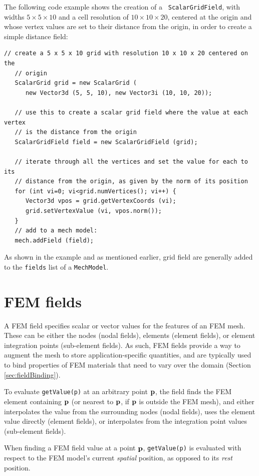 The following code example shows the creation of a {\tt
ScalarGridField}, with widths $5 \times 5 \times 10$ and a cell
resolution of $10 \times 10 \times 20$, centered at the origin and
whose vertex values are set to their distance from the origin,
in order to create a simple distance field:
%
\begin{lstlisting}[]
   // create a 5 x 5 x 10 grid with resolution 10 x 10 x 20 centered on the
   // origin
   ScalarGrid grid = new ScalarGrid (
      new Vector3d (5, 5, 10), new Vector3i (10, 10, 20));

   // use this to create a scalar grid field where the value at each vertex
   // is the distance from the origin
   ScalarGridField field = new ScalarGridField (grid);

   // iterate through all the vertices and set the value for each to its
   // distance from the origin, as given by the norm of its position
   for (int vi=0; vi<grid.numVertices(); vi++) {
      Vector3d vpos = grid.getVertexCoords (vi);
      grid.setVertexValue (vi, vpos.norm()); 
   }
   // add to a mech model:
   mech.addField (field);
\end{lstlisting}
%
As shown in the example and as mentioned earlier, grid field are
generally added to the {\tt fields} list of a {\tt MechModel}.

\section{FEM fields}
\label{sec:femFields}

A FEM field specifies scalar or vector values for the features of an
FEM mesh. These can be either the nodes (nodal fields), elements
(element fields), or element integration points (sub-element fields).
As such, FEM fields provide a way to augment the mesh to store
application-specific quantities, and are typically used to bind
properties of FEM materials that need to vary over the domain (Section
\ref{sec:fieldBinding}).

To evaluate {\tt getValue(p)} at an arbitrary point ${\bf p}$, the field
finds the FEM element containing ${\bf p}$ (or nearest to ${\bf p}$, if ${\bf p}$ is
outside the FEM mesh), and either interpolates the value from the
surrounding nodes (nodal fields), uses the element value directly
(element fields), or interpolates from the integration point values
(sub-element fields).

\begin{sideblock}
When finding a FEM field value at a point ${\bf p}$, 
{\tt getValue(p)} is evaluated with respect to the FEM model's current
{\it spatial} position, as opposed to its {\it rest} position.
\end{sideblock}

